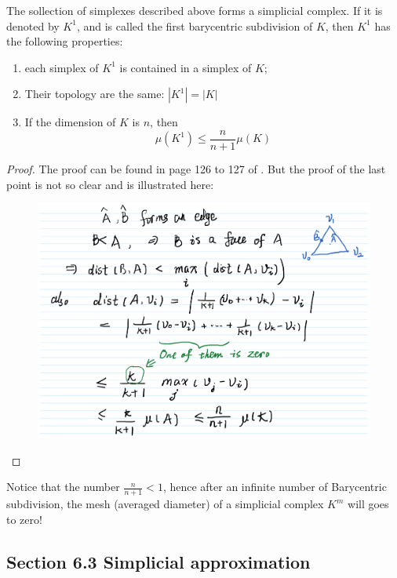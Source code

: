 \begin{lemma}
    The sollection of simplexes described above forms a simplicial
    complex. If it is denoted by $K^1$, and is called the first
    barycentric subdivision of $K$, then $K^1$ has the following
    properties:
    \begin{enumerate}
        \item each simplex of $K^1$ is contained in a simplex of $K$;
        \item Their topology are the same: $|K^1|=|K|$
        \item If the dimension of $K$ is $n$, then
            \begin{equation}
                \mu(K^1)\leq \frac{n}{n+1}\mu(K)
            \end{equation}
    \end{enumerate}
\end{lemma}
\begin{proof}
    The proof can be found in page 126 to 127 of \cite{book}. But the
    proof of the last point is not so clear and is illustrated here:
\begin{figure}[H]
    \centering
    \includegraphics[width=1\linewidth]{pics/ch6-notes-2/explain1.pdf}
\end{figure}
\end{proof}
\begin{remark}
    Notice that the number $\frac{n}{n+1}<1$, hence after an infinite
    number of Barycentric subdivision, the mesh (averaged diameter) of
    a simplicial complex $K^m$ will goes to zero!
\end{remark}
\subsection{Section 6.3 Simplicial approximation}
\label{sec:Simplicial-approximation}

